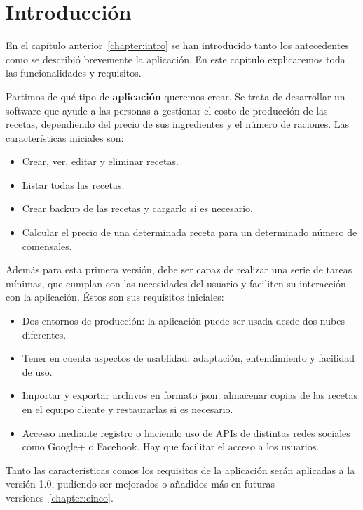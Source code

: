 \documentclass[a4paper,14pt]{book}
\begin{document}
\chapter{Introducción}\label{dos}

En el capítulo anterior~\ref{chapter:intro} se han introducido tanto los antecedentes como se describió brevemente la aplicación. En este capítulo explicaremos toda las funcionalidades y requisitos.

Partimos de qué tipo de \textbf{aplicación} queremos crear. Se trata de desarrollar un software que ayude a las personas a gestionar el costo de producción de las recetas, dependiendo del precio de sus ingredientes y el número de raciones. Las características iniciales son:
\begin{itemize}
	\item Crear, ver, editar y eliminar recetas.
	\item Listar todas las recetas.
	\item Crear backup de las recetas y cargarlo si es necesario.
	\item Calcular el precio de una determinada receta para un determinado número de comensales.
\end{itemize}

Además para esta primera versión, debe ser capaz de realizar una serie de tareas mínimas, que cumplan con las necesidades del usuario y faciliten su interacción con la aplicación. Éstos son sus requisitos iniciales:
\begin{itemize}
	\item Dos entornos de producción: la aplicación puede ser usada desde dos nubes diferentes.
	\item Tener en cuenta aspectos de usablidad: adaptación, entendimiento y facilidad de uso.
	\item Importar y exportar archivos en formato json: almacenar copias de las recetas en el equipo cliente y restaurarlas si es necesario.
	\item Accesso mediante registro o haciendo uso de APIs de distintas redes sociales como Google+ o Facebook. Hay que facilitar el acceso a los usuarios.
\end{itemize}

Tanto las características comos los requisitos de la aplicación serán aplicadas a la versión 1.0, pudiendo ser mejorados o añadidos más en futuras versiones~\ref{chapter:cinco}.
\end{document}
